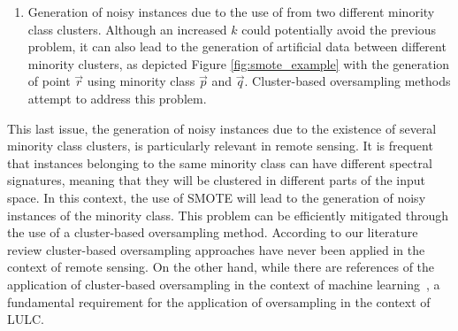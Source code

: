 \documentclass[remotesensing,article,submit,moreauthors,pdftex]{Definitions/mdpi}
\begin{document}
\begin{paracol}{2}
\begin{enumerate}
    \item Generation of noisy instances due to the use of from two different minority class clusters.
        Although an increased $k$ could potentially avoid the previous
        problem, it can also lead to the generation of artificial data between
        different minority clusters, as depicted Figure
        \ref{fig:smote_example} with the generation of point
        $\overrightarrow{r}$ using minority class $\overrightarrow{p}$ and $\overrightarrow{q}$.
        Cluster-based oversampling methods attempt to address this problem. 
\end{enumerate}

This last issue, the generation of noisy instances due to the existence of
several minority class clusters, is particularly relevant in remote sensing.
It is frequent that instances belonging to the same minority class can have
different spectral signatures, meaning that they will be clustered in
different parts of the input space.  In this context, the use of SMOTE will lead to the generation of
noisy instances of the minority class. This problem can be efficiently
mitigated through the use of a cluster-based oversampling method. According to
our literature review cluster-based oversampling approaches have never been
applied in the context of remote sensing. On the other hand, while there are
 references of the application of cluster-based oversampling
in the context of machine learning~\cite{Santos2015, Douzas2017, Ma2017,
Douzas2018},  a fundamental
requirement for the application of oversampling in the context of LULC. 


\end{paracol}
\end{document}
